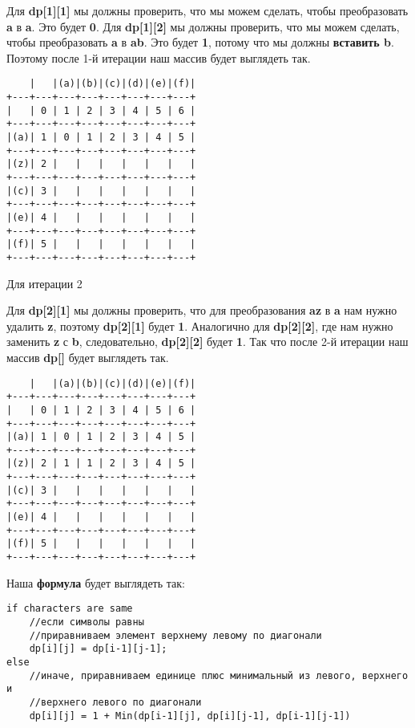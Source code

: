 Для \textbf{dp[1][1]} мы должны проверить, что мы можем сделать, чтобы преобразовать \textbf{a} в \textbf{a}. Это будет \textbf{0}. Для \textbf{dp[1][2]} мы должны проверить, что мы можем сделать, чтобы преобразовать \textbf{a} в \textbf{ab}. Это будет \textbf{1}, потому что мы должны \textbf{вставить b}. Поэтому после 1-й итерации наш массив будет выглядеть так.

\begin{tcolorbox}
\begin{verbatim}
    |   |(a)|(b)|(c)|(d)|(e)|(f)|
+---+---+---+---+---+---+---+---+
|   | 0 | 1 | 2 | 3 | 4 | 5 | 6 |
+---+---+---+---+---+---+---+---+
|(a)| 1 | 0 | 1 | 2 | 3 | 4 | 5 |
+---+---+---+---+---+---+---+---+
|(z)| 2 |   |   |   |   |   |   |
+---+---+---+---+---+---+---+---+
|(c)| 3 |   |   |   |   |   |   |
+---+---+---+---+---+---+---+---+
|(e)| 4 |   |   |   |   |   |   |
+---+---+---+---+---+---+---+---+
|(f)| 5 |   |   |   |   |   |   |
+---+---+---+---+---+---+---+---+
\end{verbatim}
\end{tcolorbox}

Для итерации 2

\vspace{\baselineskip}

Для \textbf{dp[2][1]} мы должны проверить, что для преобразования \textbf{az} в \textbf{a} нам нужно удалить \textbf{z}, поэтому \textbf{dp[2][1]} будет \textbf{1}. Аналогично для \textbf{dp[2][2]}, где нам нужно заменить \textbf{z} с \textbf{b}, следовательно, \textbf{dp[2][2]} будет \textbf{1}. Так что после 2-й итерации наш массив \textbf{dp[]} будет выглядеть так.

\begin{tcolorbox}
\begin{verbatim}
    |   |(a)|(b)|(c)|(d)|(e)|(f)|
+---+---+---+---+---+---+---+---+
|   | 0 | 1 | 2 | 3 | 4 | 5 | 6 |
+---+---+---+---+---+---+---+---+
|(a)| 1 | 0 | 1 | 2 | 3 | 4 | 5 |
+---+---+---+---+---+---+---+---+
|(z)| 2 | 1 | 1 | 2 | 3 | 4 | 5 |
+---+---+---+---+---+---+---+---+
|(c)| 3 |   |   |   |   |   |   |
+---+---+---+---+---+---+---+---+
|(e)| 4 |   |   |   |   |   |   |
+---+---+---+---+---+---+---+---+
|(f)| 5 |   |   |   |   |   |   |
+---+---+---+---+---+---+---+---+
\end{verbatim}
\end{tcolorbox}

Наша \textbf{формула} будет выглядеть так:

\begin{tcolorbox}
\begin{verbatim}
if characters are same
    //если символы равны
    //приравниваем элемент верхнему левому по диагонали
    dp[i][j] = dp[i-1][j-1];
else
    //иначе, приравниваем единице плюс минимальный из левого, верхнего и 
    //верхнего левого по диагонали
    dp[i][j] = 1 + Min(dp[i-1][j], dp[i][j-1], dp[i-1][j-1])
\end{verbatim}
\end{tcolorbox}

